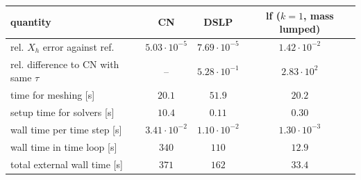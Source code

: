 \documentclass{standalone}
\begin{document}
\begin{tabular}{lccc}
  \toprule
  quantity & CN & DSLP & lf ($k=1$, mass lumped) \\
  \midrule
  rel. $X_h$ error against ref.
    & $5.03 \cdot 10^{-5}$
    & $7.69 \cdot 10^{-5}$
    & $1.42 \cdot 10^{-2}$ \\
  rel. difference to CN with same $\tau$
    & --
    & $5.28 \cdot 10^{-1}$
    & $2.83 \cdot 10^{2}$ \\
  time for meshing [s]
    & $20.1$
    & $51.9$
    & $20.2$ \\
  setup time for solvers [s]
    & $10.4$
    & $0.11$
    & $0.30$ \\
  wall time per time step [s]
    & $3.41 \cdot 10^{-2}$
    & $1.10 \cdot 10^{-2}$
    & $1.30 \cdot 10^{-3}$ \\
  wall time in time loop [s]
    & $340$
    & $110$
    & $12.9$ \\
  total external wall time [s]
    & $371$
    & $162$
    & $33.4$ \\
  \bottomrule
\end{tabular}
\end{document}
